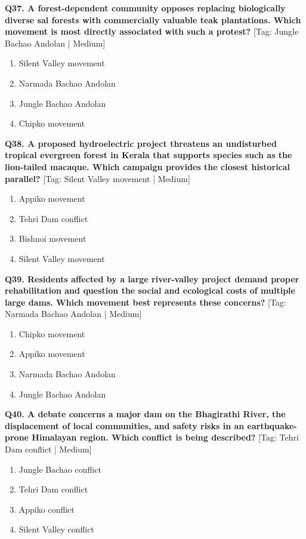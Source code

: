 \noindent\textbf{Q37. A forest-dependent community opposes replacing biologically diverse sal forests with commercially valuable teak plantations. Which movement is most directly associated with such a protest?} \hfill [Tag: Jungle Bachao Andolan | Medium]
\begin{enumerate}[label=(\alph*),topsep=2pt,itemsep=1pt,partopsep=0pt,parsep=0pt]
    \item {Silent Valley movement}
    \item {Narmada Bachao Andolan}
    \item {Jungle Bachao Andolan}
    \item {Chipko movement}
\end{enumerate}
\vspace{2mm}

\noindent\textbf{Q38. A proposed hydroelectric project threatens an undisturbed tropical evergreen forest in Kerala that supports species such as the lion-tailed macaque. Which campaign provides the closest historical parallel?} \hfill [Tag: Silent Valley movement | Medium]
\begin{enumerate}[label=(\alph*),topsep=2pt,itemsep=1pt,partopsep=0pt,parsep=0pt]
    \item {Appiko movement}
    \item {Tehri Dam conflict}
    \item {Bishnoi movement}
    \item {Silent Valley movement}
\end{enumerate}
\vspace{2mm}

\noindent\textbf{Q39. Residents affected by a large river-valley project demand proper rehabilitation and question the social and ecological costs of multiple large dams. Which movement best represents these concerns?} \hfill [Tag: Narmada Bachao Andolan | Medium]
\begin{enumerate}[label=(\alph*),topsep=2pt,itemsep=1pt,partopsep=0pt,parsep=0pt]
    \item {Chipko movement}
    \item {Appiko movement}
    \item {Narmada Bachao Andolan}
    \item {Jungle Bachao Andolan}
\end{enumerate}
\vspace{2mm}

\noindent\textbf{Q40. A debate concerns a major dam on the Bhagirathi River, the displacement of local communities, and safety risks in an earthquake-prone Himalayan region. Which conflict is being described?} \hfill [Tag: Tehri Dam conflict | Medium]
\begin{enumerate}[label=(\alph*),topsep=2pt,itemsep=1pt,partopsep=0pt,parsep=0pt]
    \item {Jungle Bachao conflict}
    \item {Tehri Dam conflict}
    \item {Appiko conflict}
    \item {Silent Valley conflict}
\end{enumerate}
\vspace{2mm}

